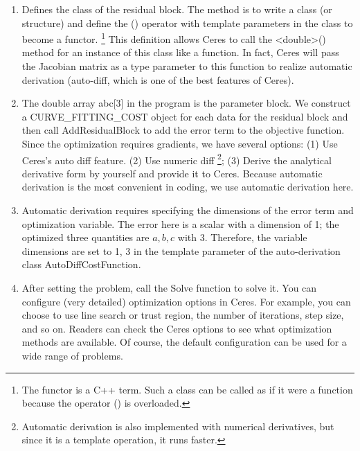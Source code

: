 \begin{enumerate}
    \item Defines the class of the residual block. The method is to write a class (or structure) and define the () operator with template parameters in the class to become a functor. \footnote{The functor is a C++ term. Such a class can be called as if it were a function because the operator () is overloaded.}  This definition allows Ceres to call the <double>() method for an instance of this class like a function. In fact, Ceres will pass the Jacobian matrix as a type parameter to this function to realize automatic derivation (auto-diff, which is one of the best features of Ceres).
    
    \item The double array abc[3] in the program is the parameter block. We construct a CURVE\_FITTING\_COST object for each data for the residual block and then call AddResidualBlock to add the error term to the objective function. Since the optimization requires gradients, we have several options: (1) Use Ceres's auto diff feature. (2) Use numeric diff \footnote{Automatic derivation is also implemented with numerical derivatives, but since it is a template operation, it runs faster. }; (3) Derive the analytical derivative form by yourself and provide it to Ceres. Because automatic derivation is the most convenient in coding, we use automatic derivation here.
    
    \item Automatic derivation requires specifying the dimensions of the error term and optimization variable. The error here is a scalar with a dimension of 1; the optimized three quantities are $a, b, c$ with 3. Therefore, the variable dimensions are set to 1, 3 in the template parameter of the auto-derivation class AutoDiffCostFunction.
    
    \item After setting the problem, call the Solve function to solve it. You can configure (very detailed) optimization options in Ceres. For example, you can choose to use line search or trust region, the number of iterations, step size, and so on. Readers can check the Ceres options to see what optimization methods are available. Of course, the default configuration can be used for a wide range of problems.
\end{enumerate}

